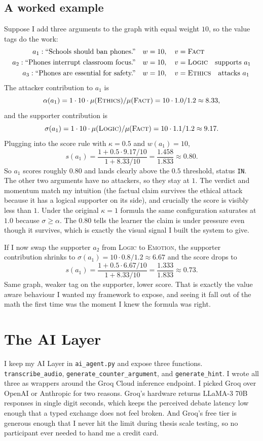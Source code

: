 \subsection{A worked example}
Suppose I add three arguments to the graph with equal weight $10$, so the value tags do the work:
\begin{align*}
a_1: \text{``Schools should ban phones.''} \quad & w=10, \quad v=\textsc{Fact} \\
a_2: \text{``Phones interrupt classroom focus.''} \quad & w=10, \quad v=\textsc{Logic} \quad \text{supports } a_1 \\
a_3: \text{``Phones are essential for safety.''} \quad & w=10, \quad v=\textsc{Ethics} \quad \text{attacks } a_1
\end{align*}
The attacker contribution to $a_1$ is
\[
\alpha(a_1) = 1 \cdot 10 \cdot \mu(\textsc{Ethics})/\mu(\textsc{Fact}) = 10 \cdot 1.0/1.2 \approx 8.33,
\]
and the supporter contribution is
\[
\sigma(a_1) = 1 \cdot 10 \cdot \mu(\textsc{Logic})/\mu(\textsc{Fact}) = 10 \cdot 1.1/1.2 \approx 9.17.
\]
Plugging into the score rule with $\kappa = 0.5$ and $w(a_1) = 10$,
\[
s(a_1) = \frac{1 + 0.5 \cdot 9.17 / 10}{1 + 8.33/10} = \frac{1.458}{1.833} \approx 0.80.
\]
So $a_1$ scores roughly $0.80$ and lands clearly above the $0.5$ threshold, status \texttt{IN}. The other two arguments have no attackers, so they stay at $1$. The verdict and momentum match my intuition (the factual claim survives the ethical attack because it has a logical supporter on its side), and crucially the score is visibly less than $1$. Under the original $\kappa = 1$ formula the same configuration saturates at $1.0$ because $\sigma \geq \alpha$. The $0.80$ tells the learner the claim is under pressure even though it survives, which is exactly the visual signal I built the system to give.

If I now swap the supporter $a_2$ from \textsc{Logic} to \textsc{Emotion}, the supporter contribution shrinks to $\sigma(a_1) = 10 \cdot 0.8/1.2 \approx 6.67$ and the score drops to
\[
s(a_1) = \frac{1 + 0.5 \cdot 6.67/10}{1 + 8.33/10} = \frac{1.333}{1.833} \approx 0.73.
\]
Same graph, weaker tag on the supporter, lower score. That is exactly the value aware behaviour I wanted my framework to expose, and seeing it fall out of the math the first time was the moment I knew the formula was right.

\section{The AI Layer}
\label{sec:impl_ai}
I keep my AI Layer in \texttt{ai\_agent.py} and expose three functions. \texttt{transcribe\_audio}, \texttt{generate\_counter\_argument}, and \texttt{generate\_hint}. I wrote all three as wrappers around the Groq Cloud \cite{groq2024api} inference endpoint. I picked Groq over OpenAI or Anthropic for two reasons. Groq's hardware returns LLaMA-3 70B \cite{meta2024llama3} responses in single digit seconds, which keeps the perceived debate latency low enough that a typed exchange does not feel broken. And Groq's free tier is generous enough that I never hit the limit during thesis scale testing, so no participant ever needed to hand me a credit card.

